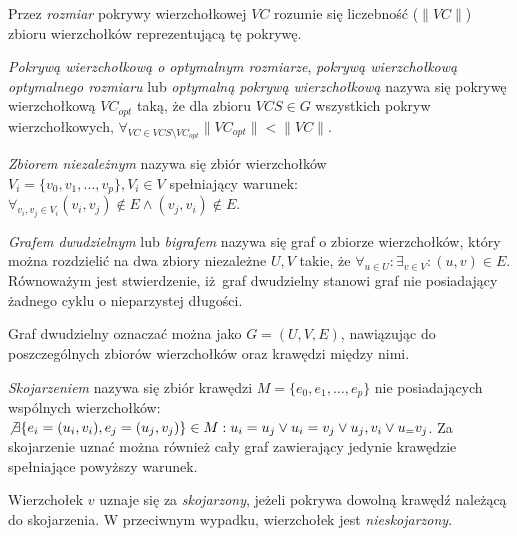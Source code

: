 \begin{definition}
  Przez \emph{rozmiar} pokrywy wierzchołkowej $VC$ rozumie się liczebność ($\|VC\|$)
  zbioru wierzchołków reprezentującą tę pokrywę.
\end{definition}

\begin{definition}
  \emph{Pokrywą wierzchołkową o optymalnym rozmiarze}, \emph{pokrywą 
  wierzchołkową optymalnego rozmiaru} lub \emph{optymalną pokrywą wierzchołkową} 
  nazywa się pokrywę wierzchołkową $VC_{opt}$ taką, że dla zbioru $VCS \in G$ 
  wszystkich pokryw wierzchołkowych, 
  $\forall_{VC \in VCS \setminus VC_{opt}}{\|VC_{opt}\| < \|VC\|}$.
\end{definition}

\begin{definition}
  \emph{Zbiorem niezależnym} nazywa się zbiór wierzchołków\\
  $V_i=\{v_0, v_1, \ldots, v_p \}, V_i \in V$ spełniający warunek:
  $\forall_{v_i, v_j \in V_i}{(v_i, v_j) \notin E \land (v_j, v_i) \notin E}$.
\end{definition}

\begin{definition}
  \emph{Grafem dwudzielnym} lub \emph{bigrafem} nazywa się graf o zbiorze 
  wierzchołków, który można rozdzielić na dwa zbiory niezależne $U, V$ takie, że
  $\forall_{u \in U}: \exists_{v \in V}: (u,v) \in E$.
  Równoważym jest stwierdzenie, iż graf dwudzielny stanowi graf nie posiadający
  żadnego cyklu o nieparzystej długości.


  Graf dwudzielny oznaczać można jako $G=(U,V,E)$, nawiązując do poszczególnych
  zbiorów wierzchołków oraz krawędzi między nimi.
\end{definition}

\begin{definition}
  \emph{Skojarzeniem} nazywa się zbiór krawędzi $M=\{e_0, e_1, \ldots, e_p\}$
  nie posiadających wspólnych wierzchołków: ${\not\exists{\{e_i=(u_i,v_i),
  e_j=(u_j, v_j)\} \in M}: u_i=u_j \lor u_i=v_j \lor u_j,v_i \lor u_=v_j}$.
  Za skojarzenie uznać można również cały graf zawierający jedynie krawędzie
  spełniające powyższy warunek.
\end{definition}

\begin{definition}
  Wierzchołek $v$ uznaje się za \emph{skojarzony}, jeżeli pokrywa dowolną
  krawędź należącą do skojarzenia.
  W przeciwnym wypadku, wierzchołek jest \emph{nieskojarzony}.
\end{definition}

